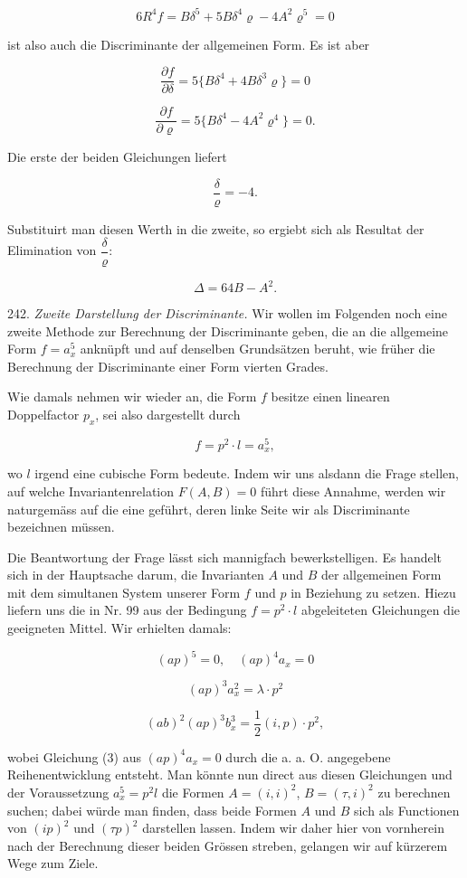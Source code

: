 \documentclass[11pt]{article}
\providecommand{\weberpage}[1]{}
\providecommand{\weq}[2]{\begin{equation}\tag{#1}#2\end{equation}}
\let\Delta\varDelta
\begin{document}
\[ 6R^4f = B\delta^5+5B\delta^4\varrho-4A^2\varrho^5=0 \]

ist also auch die Discriminante der allgemeinen Form. Es ist aber

\[ \frac{\partial f}{\partial\delta} = 5\{B\delta^4+4B\delta^3\varrho\}=0 \]

\[ \frac{\partial f}{\partial\varrho} = 5\{B\delta^4-4A^2\varrho^4\}=0. \]

Die erste der beiden Gleichungen liefert

\[ \frac{\delta}{\varrho} = -4. \]

Substituirt man diesen Werth in die zweite, so ergiebt sich als
Resultat der Elimination von $\dfrac{\delta}{\varrho}$:

\[ \Delta = 64B-A^2. \]

242. \textit{Zweite Darstellung der Discriminante.} Wir wollen im Folgenden
 noch eine zweite Methode zur Berechnung der Discriminante geben,
die an die allgemeine Form $f=a_x^5$ anknüpft und auf denselben Grundsätzen
 beruht, wie früher die Berechnung der Discriminante einer
Form vierten Grades.

Wie damals nehmen wir wieder an, die Form $f$ besitze einen
linearen Doppelfactor $p_x$, sei also dargestellt durch

\[ f = p^2\cdot l = a_x^5, \]

wo $l$ irgend eine cubische Form bedeute. Indem wir uns alsdann die
Frage stellen, auf welche Invariantenrelation $F(A,B)=0$ führt diese
Annahme, werden wir naturgemäss auf die eine geführt, deren linke
Seite wir als Discriminante bezeichnen müssen.

Die Beantwortung der Frage lässt sich mannigfach bewerkstelligen.
Es handelt sich in der Hauptsache darum, die Invarianten $A$ und $B$
der allgemeinen Form mit dem simultanen System unserer Form $f$
und $p$ in Beziehung zu setzen. Hiezu liefern uns die in Nr. 99 aus
der Bedingung $f=p^2\cdot l$ abgeleiteten Gleichungen die geeigneten
Mittel. Wir erhielten damals:

\weq{1}{(ap)^5=0, \quad (ap)^4a_x=0}

\weq{2}{(ap)^3a_x^2=\lambda\cdot p^2}

\weq{3}{(ab)^2(ap)^3b_x^3=\frac{1}{2}(i,p)\cdot p^2,}


\weberpage{268}
wobei Gleichung (3) aus $(ap)^4a_x=0$ durch die a. a. O. angegebene
Reihenentwicklung entsteht. Man könnte nun direct aus diesen
Gleichungen und der Voraussetzung $a_x^5=p^2l$ die Formen $A=(i,i)^2$,
$B=(\tau,i)^2$ zu berechnen suchen; dabei würde man finden, dass beide
Formen $A$ und $B$ sich als Functionen von $(ip)^2$ und $(\tau p)^2$ darstellen
lassen. Indem wir daher hier von vornherein nach der Berechnung
dieser beiden Grössen streben, gelangen wir auf kürzerem Wege
zum Ziele.
\end{document}

